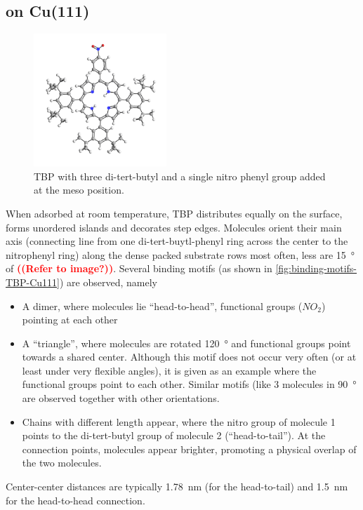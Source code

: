 	\subsection{on Cu(111)}
	\label{sec:single-TBP-Cu111}
	\begin{figure}\centering
		\includegraphics[angle=90, width=5cm]{./images/molecules/max-zoom/TBP-single-600}
		\caption{TBP with three di-tert-butyl and a single nitro phenyl group added at the meso position.}
		\label{fig:}
	\end{figure}
	When adsorbed at room temperature, TBP distributes equally on the surface, forms unordered islands and decorates step edges. Molecules orient their main axis (connecting line from one di-tert-buytl-phenyl ring across the center to the nitrophenyl ring) along the dense packed substrate rows most often, less are \SI{15}{\degree} of \textcolor{red}{\textbf{((Refer to image?))}}. Several binding motifs (as shown in \autoref{fig:binding-motifs-TBP-Cu111}) are observed, namely
	\begin{itemize}
		\item A dimer, where molecules lie ``head-to-head'', functional groups ($NO_2$) pointing at each other
		\item A ``triangle'', where molecules are rotated \SI{120}{\degree} and functional groups point towards a shared center. Although this motif does not occur very often (or at least under very flexible angles), it is given as an example where the functional groups point to each other. Similar motifs (like 3 molecules in \SI{90}{\degree} are observed together with other orientations. 
		\item Chains with different length appear, where the nitro group of molecule 1 points to the di-tert-butyl group of molecule 2 (``head-to-tail''). At the connection points, molecules appear brighter, promoting a physical overlap of the two molecules.
	\end{itemize}
	
	Center-center distances are typically \SI{1.78}{\nano \meter} (for the head-to-tail) and \SI{1.5}{\nano \meter} for the head-to-head connection. 
	
